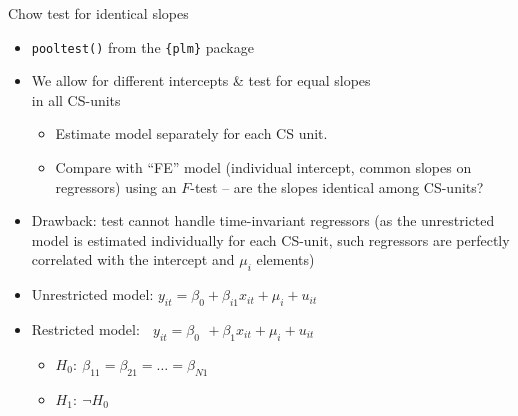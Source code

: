\documentclass{beamer}
\begin{document}
\begin{frame}{Chow test for identical slopes}
\begin{itemize}
    \item \texttt{pooltest()} from the \texttt{\{plm\}} package 
    \smallskip
    \item We allow for different intercepts \& test for equal slopes \\in all CS-units
    \begin{itemize}
        \item Estimate model separately for each CS unit.
        \item Compare with ``FE'' model (individual intercept, common slopes on regressors) using an $F$-test -- are the slopes identical among CS-units?
    \end{itemize}
    \smallskip
    \item Drawback: test cannot handle time-invariant regressors (as the unrestricted model is estimated individually for each CS-unit, such regressors are perfectly correlated with the intercept and $\mu_i$ elements)
    \medskip
    \item Unrestricted model: $y_{it} = \beta_{0} + \beta_{i1} x_{it} + \mu_i + u_{it}$
    \smallskip
    \item Restricted model: $\,~~y_{it} = \beta_{0}~ \, + \beta_1 x_{it} + \mu_i + u_{it}$
\begin{itemize}
    \item[] $H_0:~\beta_{11}=\beta_{21}=\dots=\beta_{N1}$  
    \item[] $H_1:~\neg H_0$
\end{itemize}
\end{itemize}
\end{frame}
\end{document}
